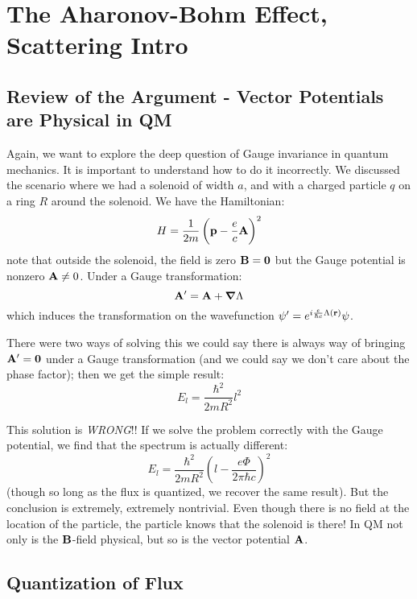 \section{The Aharonov-Bohm Effect, Scattering Intro}
\subsection{Review of the Argument - Vector Potentials are Physical in QM}
Again, we want to explore the deep question of Gauge invariance in quantum mechanics. It is important to understand how to do it incorrectly. We discussed the scenario where we had a solenoid of width $a$, and with a charged particle $q$ on a ring $R$ around the solenoid. We have the Hamiltonian:
\begin{equation}
    H = \frac{1}{2m}\left(\mathbf{p} - \frac{e}{c}\mathbf{A}\right)^2
\end{equation}
note that outside the solenoid, the field is zero $\mathbf{B} = \mathbf{0}$ but the Gauge potential is nonzero $\mathbf{A} \neq 0$. Under a Gauge transformation:
\begin{equation}
    \v{A}' = \v{A} + \nabla \Lambda
\end{equation}
which induces the transformation on the wavefunction $\psi' = e^{i\frac{e}{\hbar c}\Lambda(\mathbf{r})}\psi$.

There were two ways of solving this we could say there is always way of bringing $\mathbf{A}' = \mathbf{0}$ under a Gauge transformation (and we could say we don't care about the phase factor); then we get the simple result:
\begin{equation}
    E_l = \frac{\hbar^2}{2mR^2}l^2
\end{equation}

This solution is \emph{WRONG}!! If we solve the problem correctly with the Gauge potential, we find that the spectrum is actually different:
\begin{equation}
    E_l = \frac{\hbar^2}{2mR^2}\left(l - \frac{e\Phi}{2\pi\hbar c}\right)^2
\end{equation}
(though so long as the flux is quantized, we recover the same result). But the conclusion is extremely, extremely nontrivial. Even though there is no field at the location of the particle, the particle knows that the solenoid is there! In QM not only is the $\mathbf{B}$-field physical, but so is the vector potential $\mathbf{A}$. 

\subsection{Quantization of Flux}

